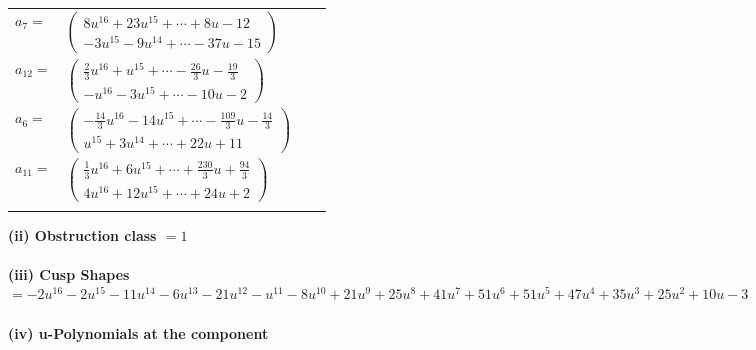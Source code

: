 \documentclass[1p]{elsarticle_modified}
\theoremstyle{definition}
\begin{document}
\begin{tabular}{m{7pt} m{180pt} m{7pt} m{180pt} }
\flushright $a_{7}=$&$\begin{pmatrix}8 u^{16}+23 u^{15}+\cdots+8 u-12\\-3 u^{15}-9 u^{14}+\cdots-37 u-15\end{pmatrix}$ \\
\flushright $a_{12}=$&$\begin{pmatrix}\frac{2}{3} u^{16}+u^{15}+\cdots-\frac{26}{3} u-\frac{19}{3}\\- u^{16}-3 u^{15}+\cdots-10 u-2\end{pmatrix}$ \\
\flushright $a_{6}=$&$\begin{pmatrix}-\frac{14}{3} u^{16}-14 u^{15}+\cdots-\frac{109}{3} u-\frac{14}{3}\\u^{15}+3 u^{14}+\cdots+22 u+11\end{pmatrix}$ \\
\flushright $a_{11}=$&$\begin{pmatrix}\frac{1}{3} u^{16}+6 u^{15}+\cdots+\frac{230}{3} u+\frac{94}{3}\\4 u^{16}+12 u^{15}+\cdots+24 u+2\end{pmatrix}$\\&\end{tabular}
\flushleft \textbf{(ii) Obstruction class $= 1$}\\~\\
\flushleft \textbf{(iii) Cusp Shapes $= -2 u^{16}-2 u^{15}-11 u^{14}-6 u^{13}-21 u^{12}- u^{11}-8 u^{10}+21 u^9+25 u^8+41 u^7+51 u^6+51 u^5+47 u^4+35 u^3+25 u^2+10 u-3$}\\~\\
\newpage\renewcommand{\arraystretch}{1}
\flushleft \textbf{(iv) u-Polynomials at the component}\newline \\
\end{document}
